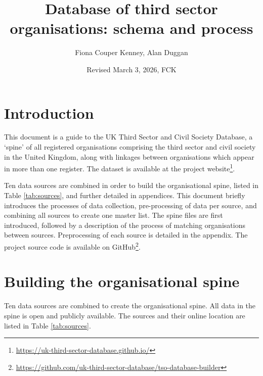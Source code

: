 \documentclass{article}
\title{Database of third sector organisations: schema and process}
\author{Fiona Couper Kenney, Alan Duggan}
\date{Revised March 3, 2026, FCK}
\begin{document}
\maketitle
\section{Introduction}
This document is a guide to the UK Third Sector and Civil Society Database, a ‘spine’ of all 
registered organisations comprising the third sector and civil society in the United Kingdom, along with 
linkages between organisations which appear in more than one register. The dataset is available at the project website\footnote{\url{https://uk-third-sector-database.github.io/}}.

Ten data sources are combined in order to build the organisational spine, listed in Table \ref{tab:sources}, and further detailed in appendices. 
This document briefly introduces the processes of data collection, pre-processing of 
data per source, and combining all sources to create one master list.  The spine files are first introduced, followed by a description of the process of matching organisations between sources. 
Preprocessing of each source is detailed in the appendix. The project source code is available on GitHub\footnote{\url{https://github.com/uk-third-sector-database/tso-database-builder}}.

\section{Building the organisational spine}

Ten data sources are combined to create the organisational spine. All data in the spine is open and publicly available. The sources and 
their online location are listed in Table \ref{tab:sources}. 
\end{document}
